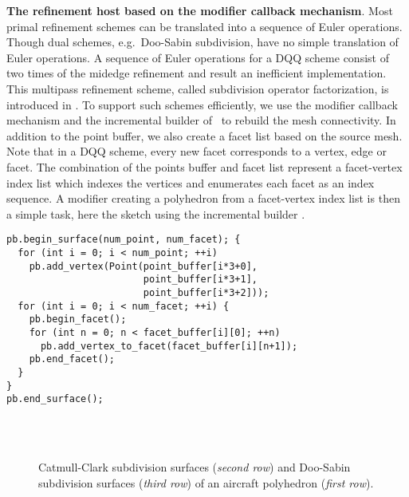 \noindent\textbf{The refinement host based on the modifier callback mechanism}.
Most primal refinement schemes can be translated into a sequence of
Euler operations. Though dual schemes, e.g.\ Doo-Sabin subdivision,
have no simple translation of Euler operations. A sequence of Euler
operations for a DQQ scheme consist of two times of the midedge
refinement \cite{Peters:1997:SSS} and result an inefficient
implementation. This multipass refinement scheme, called subdivision
operator factorization, is introduced in \cite{Peter:2003:CPDSS}.  To
support such schemes efficiently, we use the modifier callback
mechanism and the incremental builder of \cgalpoly\ to rebuild the
mesh connectivity. In addition to the point buffer, we also create a
facet list based on the source mesh. Note that in a DQQ scheme, every
new facet corresponds to a vertex, edge or facet. The combination of
the points buffer and facet list represent a facet-vertex index list
which indexes the vertices and enumerates each facet as an index
sequence. A modifier creating a polyhedron from a facet-vertex index
list is then a simple task, here the sketch using the incremental
builder .
\begin{lstlisting}
pb.begin_surface(num_point, num_facet); {
  for (int i = 0; i < num_point; ++i) 
    pb.add_vertex(Point(point_buffer[i*3+0], 
                        point_buffer[i*3+1], 
                        point_buffer[i*3+2]));        
  for (int i = 0; i < num_facet; ++i) {
    pb.begin_facet();
    for (int n = 0; n < facet_buffer[i][0]; ++n)
      pb.add_vertex_to_facet(facet_buffer[i][n+1]);
    pb.end_facet();
  }
}
pb.end_surface();
\end{lstlisting}

\begin{figure}
  \centering
   \\
  \\
  \caption{Catmull-Clark subdivision surfaces ({\itshape second row}) and
  Doo-Sabin subdivision surfaces ({\itshape third row}) 
  of an aircraft polyhedron ({\itshape first row}).
  }
  \label{fig:SubExample}
\end{figure}

